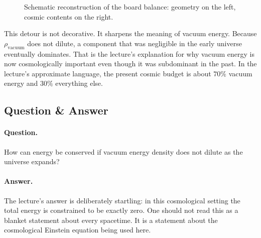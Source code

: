 \begin{figure}[t]
\centering
{}
\caption{Schematic reconstruction of the board balance: geometry on the left, cosmic contents on the right.}
\end{figure}

This detour is not decorative. It sharpens the meaning of vacuum energy. Because \(\rho_{\mathrm{vacuum}}\) does not dilute, a component that was negligible in the early universe eventually dominates. That is the lecture's explanation for why vacuum energy is now cosmologically important even though it was subdominant in the past. In the lecture's approximate language, the present cosmic budget is about \(70\%\) vacuum energy and \(30\%\) everything else.

\subsection{Question \& Answer}

\paragraph{Question.} How can energy be conserved if vacuum energy density does not dilute as the universe expands?

\paragraph{Answer.} The lecture's answer is deliberately startling: in this cosmological setting the total energy is constrained to be exactly zero. One should not read this as a blanket statement about every spacetime. It is a statement about the cosmological Einstein equation being used here.

